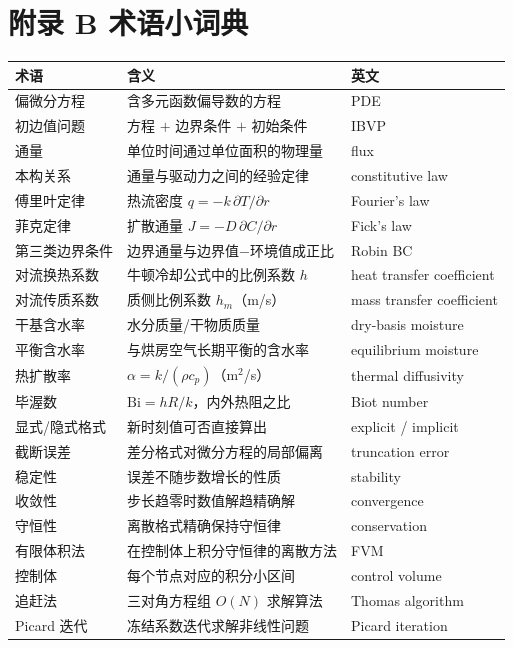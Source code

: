 \documentclass[12pt,a4paper]{ctexart}
\begin{document}
\section{附录 B 术语小词典}

\begin{center}
{\begin{tabular}{lll}
\toprule
术语 & 含义 & 英文 \\
\midrule
偏微分方程 & 含多元函数偏导数的方程 & PDE \\
初边值问题 & 方程 $+$ 边界条件 $+$ 初始条件 & IBVP \\
通量 & 单位时间通过单位面积的物理量 & flux \\
本构关系 & 通量与驱动力之间的经验定律 & constitutive law \\
傅里叶定律 & 热流密度 $q=-k\,\partial T/\partial r$ & Fourier's law \\
菲克定律 & 扩散通量 $J=-D\,\partial C/\partial r$ & Fick's law \\
第三类边界条件 & 边界通量与边界值$-$环境值成正比 & Robin BC \\
对流换热系数 & 牛顿冷却公式中的比例系数 $h$ & heat transfer coefficient \\
对流传质系数 & 质侧比例系数 $h_m$（m/s） & mass transfer coefficient \\
干基含水率 & 水分质量/干物质质量 & dry-basis moisture \\
平衡含水率 & 与烘房空气长期平衡的含水率 & equilibrium moisture \\
热扩散率 & $\alpha=k/(\rho c_p)$（m$^2$/s） & thermal diffusivity \\
毕渥数 & $\mathrm{Bi}=hR/k$，内外热阻之比 & Biot number \\
显式/隐式格式 & 新时刻值可否直接算出 & explicit / implicit \\
截断误差 & 差分格式对微分方程的局部偏离 & truncation error \\
稳定性 & 误差不随步数增长的性质 & stability \\
收敛性 & 步长趋零时数值解趋精确解 & convergence \\
守恒性 & 离散格式精确保持守恒律 & conservation \\
有限体积法 & 在控制体上积分守恒律的离散方法 & FVM \\
控制体 & 每个节点对应的积分小区间 & control volume \\
追赶法 & 三对角方程组 $O(N)$ 求解算法 & Thomas algorithm \\
Picard 迭代 & 冻结系数迭代求解非线性问题 & Picard iteration \\

\end{tabular}}
\end{center}
\end{document}
